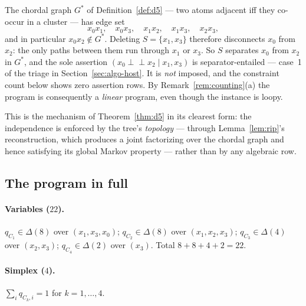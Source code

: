 \documentclass[11pt]{article}
\theoremstyle{definition}
\newcommand{\indep}{\perp\!\!\!\perp}
\begin{document}
The chordal graph $G^\ast$ of Definition~\ref{def:d5} --- two atoms adjacent iff
they co-occur in a cluster --- has edge set
\[
  x_0x_1,\quad x_0x_3,\quad x_1x_2,\quad x_1x_3,\quad x_2x_3,
\]
and in particular $x_0x_2\notin G^\ast$. Deleting $S=\{x_1,x_3\}$ therefore
disconnects $x_0$ from $x_2$: the only paths between them run through $x_1$ or
$x_3$. So $S$ separates $x_0$ from $x_2$ in $G^\ast$, and the sole assertion
$(x_0\indep x_2\mid x_1,x_3)$ is separator-entailed --- case~1 of the triage in
Section~\ref{sec:algo-host}. It is \emph{not} imposed, and the constraint count
below shows zero assertion rows. By Remark~\ref{rem:counting}(a) the program is
consequently a \emph{linear} program, even though the instance is loopy.

This is the mechanism of Theorem~\ref{thm:d5} in its clearest form: the
independence is enforced by the tree's \emph{topology} --- through
Lemma~\ref{lem:rip}'s reconstruction, which produces a joint factorizing over
the chordal graph and hence satisfying its global Markov property --- rather than
by any algebraic row.

\subsection{The program in full}

\paragraph{Variables ($22$).}
$q_{C_1}\in\Delta(8)$ over $(x_1,x_3,x_0)$; $q_{C_2}\in\Delta(8)$ over
$(x_1,x_2,x_3)$; $q_{C_3}\in\Delta(4)$ over $(x_2,x_3)$;
$q_{C_4}\in\Delta(2)$ over $(x_3)$. Total $8+8+4+2=22$.

\paragraph{Simplex ($4$).}
$\sum_i q_{C_k,i}=1$ for $k=1,\dots,4$.
\end{document}
